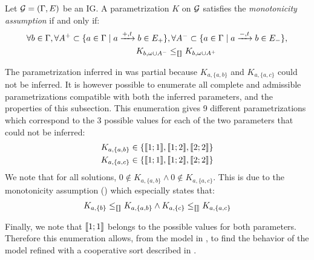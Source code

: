 \begin{property}
\label{pro:param_enum_monotonicity}
Let $\mathcal{G} = (\Gamma, E)$ be an IG. A parametrization $K$ on $\mathcal{G}$ satisfies the \emph{monotonicity assumption} if and only if:
\begin{align*}
  \forall b \in \Gamma,
  \forall A^+ \subset \{ a \in \Gamma \mid a \xrightarrow{+, t} b \in E_+ \}&,
  \forall A^- \subset \{ a \in \Gamma \mid a \xrightarrow{-, t} b \in E_- \},\\
  K_{b,\omega \cup A^-} & \leq_{\llbracket\rrbracket} K_{b,\omega \cup A^+}
\end{align*}
\end{property}

\begin{example}\label{ex:enum-param-runningPH-1}
The parametrization inferred in  was partial because $K_{a,\{a,b\}}$ and $K_{a,\{a,c\}}$ could not be inferred.
It is however possible to enumerate all complete and admissible parametrizations
compatible with both the inferred parameters, and the properties of this subsection.
This enumeration gives 9 different parametrizations which correspond to the 3 possible values
for each of the two parameters that could not be inferred:
\begin{align*}
  K_{a,\{a,b\}} &\in \{ \llbracket 1 ; 1 \rrbracket, \llbracket 1 ; 2 \rrbracket, \llbracket 2 ; 2 \rrbracket \} \\
  K_{a,\{a,c\}} &\in \{ \llbracket 1 ; 1 \rrbracket, \llbracket 1 ; 2 \rrbracket, \llbracket 2 ; 2 \rrbracket \}
\end{align*}
We note that for all solutions, $0 \notin K_{a,\{a,b\}} \wedge 0 \notin K_{a,\{a,c\}}$.
This is due to the monotonicity assumption () which especially states that:
\begin{align*}
  K_{a,\{b\}} \leq_{\llbracket\rrbracket} K_{a,\{a,b\}} \wedge
  K_{a,\{c\}} \leq_{\llbracket\rrbracket} K_{a,\{a,c\}}
\end{align*}

Finally, we note that $\llbracket 1 ; 1 \rrbracket$ belongs to the possible values for both parameters.
Therefore this enumeration allows, from the model in ,
to find the behavior of the model refined with a cooperative sort described in .
\end{example}
